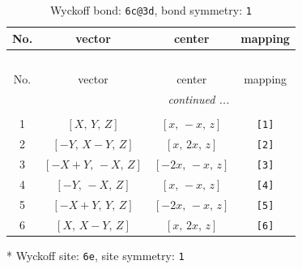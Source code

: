 \documentclass[fleqn,8pt]{jsarticle}
\begin{document}
\renewcommand{\arraystretch}{1.2}
\begin{longtable}{cccc}
\caption{Wyckoff bond: {\tt 6c@3d}, bond symmetry: {\tt 1}}
 \\
 \hline \hline
No. & vector & center & mapping \\ \hline \endfirsthead

\multicolumn{3}{l}{\tablename\ \thetable{}} \\
 \hline \hline
No. & vector & center & mapping \\ \hline \endhead

 \hline \hline
\multicolumn{3}{r}{\footnotesize\it continued ...} \\ \endfoot

 \hline \hline
\multicolumn{3}{r}{} \\ \endlastfoot

1 & $\left[ X,\, Y,\, Z \right]$ & $\left[ x,\, - x,\, z \right]$ & {\tt [1]} \\ \hline
2 & $\left[ - Y,\, X - Y,\, Z \right]$ & $\left[ x,\, 2 x,\, z \right]$ & {\tt [2]} \\ \hline
3 & $\left[ - X + Y,\, - X,\, Z \right]$ & $\left[ - 2 x,\, - x,\, z \right]$ & {\tt [3]} \\ \hline
4 & $\left[ - Y,\, - X,\, Z \right]$ & $\left[ x,\, - x,\, z \right]$ & {\tt [4]} \\ \hline
5 & $\left[ - X + Y,\, Y,\, Z \right]$ & $\left[ - 2 x,\, - x,\, z \right]$ & {\tt [5]} \\ \hline
6 & $\left[ X,\, X - Y,\, Z \right]$ & $\left[ x,\, 2 x,\, z \right]$ & {\tt [6]} \\
\end{longtable}
* Wyckoff site: {\tt 6e}, site symmetry: {\tt 1}
\renewcommand{\arraystretch}{1.2}
\end{document}
